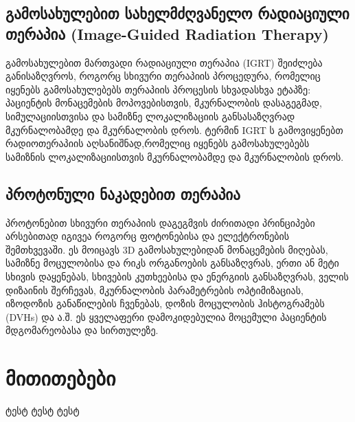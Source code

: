 \documentclass[12pt,a4paper,]{report}
\begin{document}
\section{გამოსახულებით სახელმძღვანელო რადიაციული თერაპია (Image-Guided Radiation Therapy)}
გამოსახულებით მართვადი რადიაციული თერაპია (IGRT)  შეიძლება განისაზღვროს, როგორც სხივური თერაპიის პროცედურა, რომელიც იყენებს გამოსახულებებს თერაპიის პროცესის სხვადასხვა ეტაპზე: პაციენტის მონაცემების მოპოვებისთვის, მკურნალობის დასაგეგმად, სიმულაციისთვისა და სამიზნე ლოკალიზაციის განსასაზღვრად მკურნალობამდე და მკურნალობის დროს. ტერმინ IGRT ს გამოვიყენებთ რადიოთერაპიის აღსანიშნად,რომელიც იყენებს გამოსახულებებს სამიზნის ლოკალიზაციისთვის მკურნალობამდე და მკურნალობის დროს.

\section{პროტონული ნაკადებით თერაპია}
პროტონებით სხივური თერაპიის დაგეგმვის ძირითადი პრინციპები არსებითად იგივეა როგორც ფოტონებისა და ელექტრონების შემთხვევაში. ეს მოიცავს 3D გამოსახულებიდან მონაცემების მიღებას, სამიზნე მოცულობისა და რიკს ორგანოების განსაზღვრას, ერთი ან მეტი სხივის დაყენებას, სხივების კუთხეებისა და ენერგიის განსაზღვრას, ველის დიზაინის შერჩევას, მკურნალობის პარამეტრების ოპტიმიზაციას, იზოდოზის განაწილების ჩვენებას, დოზის მოცულობის ჰისტოგრამებს (DVHs)  და ა.შ. ეს ყველაფერი დამოკიდებულია მოცემული პაციენტის მდგომარეობასა და სირთულეზე.
\medskip


\chapter{მითითებები}
ტესტ ტესტ ტესტ
 
\end{document}
